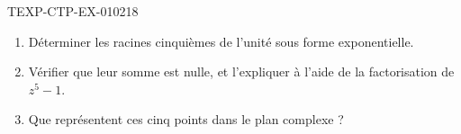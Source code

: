 \begin{exercice}{TEXP-CTP-EX-010}{2}{18}
\begin{enumerate}
  \item Déterminer les racines cinquièmes de l'unité sous forme exponentielle.
  \item Vérifier que leur somme est nulle, et l'expliquer à l'aide de la
        factorisation de $z^5-1$.
  \item Que représentent ces cinq points dans le plan complexe ?
\end{enumerate}
\end{exercice}
